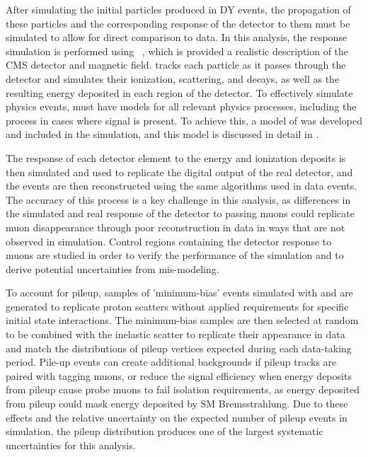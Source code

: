 After simulating the initial particles produced in DY events, the propagation of these particles and the corresponding response of the detector to them must be simulated to allow for direct comparison to data.
In this analysis, the response simulation is performed using \geant~\cite{geantRef}, which is provided a realistic description of the CMS detector and magnetic field.
\geant tracks each particle as it passes through the detector and simulates their ionization, scattering, and decays, as well as the resulting energy deposited in each region of the detector.
To effectively simulate physics events, \geant must have models for all relevant physics processes, including the \dbrem process in cases where signal is present. 
To achieve this, a model of \dbrem was developed and included in the \geant simulation, and this model is discussed in detail in .

The response of each detector element to the energy and ionization deposits is then simulated and used to replicate the digital output of the real detector, and the events are then reconstructed using the same algorithms used in data events.
The accuracy of this process is a key challenge in this analysis, as differences in the simulated and real response of the detector to passing muons could replicate muon disappearance through poor reconstruction in data in ways that are not observed in simulation. 
Control regions containing the detector response to muons are studied in order to verify the performance of the simulation and to derive potential uncertainties from mis-modeling.

To account for pileup, samples of 'minimum-bias' events simulated with \pythia and \geant are generated to replicate proton scatters without applied requirements for specific initial state interactions.
The minimum-bias samples are then selected at random to be combined with the inelastic scatter to replicate their appearance in data and match the distributions of pileup vertices expected during each data-taking period.
Pile-up events can create additional backgrounds if pileup tracks are paired with tagging muons, or reduce the signal efficiency when energy deposits from pileup cause probe muons to fail isolation requirements, as energy deposited from pileup could mask energy deposited by SM Bremsstrahlung.
Due to these effects and the relative uncertainty on the expected number of pileup events in simulation, the pileup distribution produces one of the largest systematic uncertainties for this analysis.

